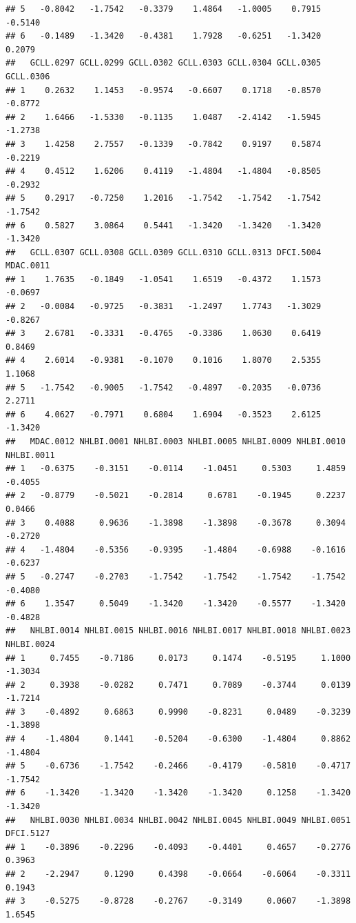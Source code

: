 \documentclass[
]{article}
\begin{document}
\begin{verbatim}
## 5   -0.8042   -1.7542   -0.3379    1.4864   -1.0005    0.7915   -0.5140
## 6   -0.1489   -1.3420   -0.4381    1.7928   -0.6251   -1.3420    0.2079
##   GCLL.0297 GCLL.0299 GCLL.0302 GCLL.0303 GCLL.0304 GCLL.0305 GCLL.0306
## 1    0.2632    1.1453   -0.9574   -0.6607    0.1718   -0.8570   -0.8772
## 2    1.6466   -1.5330   -0.1135    1.0487   -2.4142   -1.5945   -1.2738
## 3    1.4258    2.7557   -0.1339   -0.7842    0.9197    0.5874   -0.2219
## 4    0.4512    1.6206    0.4119   -1.4804   -1.4804   -0.8505   -0.2932
## 5    0.2917   -0.7250    1.2016   -1.7542   -1.7542   -1.7542   -1.7542
## 6    0.5827    3.0864    0.5441   -1.3420   -1.3420   -1.3420   -1.3420
##   GCLL.0307 GCLL.0308 GCLL.0309 GCLL.0310 GCLL.0313 DFCI.5004 MDAC.0011
## 1    1.7635   -0.1849   -1.0541    1.6519   -0.4372    1.1573   -0.0697
## 2   -0.0084   -0.9725   -0.3831   -1.2497    1.7743   -1.3029   -0.8267
## 3    2.6781   -0.3331   -0.4765   -0.3386    1.0630    0.6419    0.8469
## 4    2.6014   -0.9381   -0.1070    0.1016    1.8070    2.5355    1.1068
## 5   -1.7542   -0.9005   -1.7542   -0.4897   -0.2035   -0.0736    2.2711
## 6    4.0627   -0.7971    0.6804    1.6904   -0.3523    2.6125   -1.3420
##   MDAC.0012 NHLBI.0001 NHLBI.0003 NHLBI.0005 NHLBI.0009 NHLBI.0010 NHLBI.0011
## 1   -0.6375    -0.3151    -0.0114    -1.0451     0.5303     1.4859    -0.4055
## 2   -0.8779    -0.5021    -0.2814     0.6781    -0.1945     0.2237     0.0466
## 3    0.4088     0.9636    -1.3898    -1.3898    -0.3678     0.3094    -0.2720
## 4   -1.4804    -0.5356    -0.9395    -1.4804    -0.6988    -0.1616    -0.6237
## 5   -0.2747    -0.2703    -1.7542    -1.7542    -1.7542    -1.7542    -0.4080
## 6    1.3547     0.5049    -1.3420    -1.3420    -0.5577    -1.3420    -0.4828
##   NHLBI.0014 NHLBI.0015 NHLBI.0016 NHLBI.0017 NHLBI.0018 NHLBI.0023 NHLBI.0024
## 1     0.7455    -0.7186     0.0173     0.1474    -0.5195     1.1000    -1.3034
## 2     0.3938    -0.0282     0.7471     0.7089    -0.3744     0.0139    -1.7214
## 3    -0.4892     0.6863     0.9990    -0.8231     0.0489    -0.3239    -1.3898
## 4    -1.4804     0.1441    -0.5204    -0.6300    -1.4804     0.8862    -1.4804
## 5    -0.6736    -1.7542    -0.2466    -0.4179    -0.5810    -0.4717    -1.7542
## 6    -1.3420    -1.3420    -1.3420    -1.3420     0.1258    -1.3420    -1.3420
##   NHLBI.0030 NHLBI.0034 NHLBI.0042 NHLBI.0045 NHLBI.0049 NHLBI.0051 DFCI.5127
## 1    -0.3896    -0.2296    -0.4093    -0.4401     0.4657    -0.2776    0.3963
## 2    -2.2947     0.1290     0.4398    -0.0664    -0.6064    -0.3311    0.1943
## 3    -0.5275    -0.8728    -0.2767    -0.3149     0.0607    -1.3898    1.6545

\end{verbatim}
\end{document}
